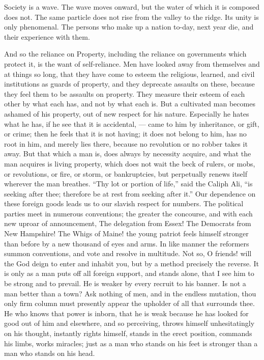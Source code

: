 \documentclass{article}
\begin{document}
Society is a wave. The wave moves onward, but the water of which it is
composed does not. The same particle does not rise from the valley to the
ridge. Its unity is only phenomenal. The persons who make up a nation
to-day, next year die, and their experience with them.

And so the reliance on Property, including the reliance on governments which
protect it, is the want of self-reliance. Men have looked away from
themselves and at things so long, that they have come to esteem the
religious, learned, and civil institutions as guards of property, and they
deprecate assaults on these, because they feel them to be assaults on
property. They measure their esteem of each other by what each has, and not
by what each is. But a cultivated man becomes ashamed of his property, out
of new respect for his nature. Especially he hates what he has, if he see
that it is accidental, --- came to him by inheritance, or gift, or crime;
then he feels that it is not having; it does not belong to him, has no root
in him, and merely lies there, because no revolution or no robber takes it
away. But that which a man is, does always by necessity acquire, and what the
man acquires is living property, which does not wait the beck of rulers, or
mobs, or revolutions, or fire, or storm, or bankruptcies, but perpetually
renews itself wherever the man breathes. ``Thy lot or portion of life,'' said
the Caliph Ali, ``is seeking after thee; therefore be at rest from seeking
after it.'' Our dependence on these foreign goods leads us to our slavish
respect for numbers. The political parties meet in numerous conventions; the
greater the concourse, and with each new uproar of announcement, The
delegation from Essex! The Democrats from New Hampshire! The Whigs of Maine!
the young patriot feels himself stronger than before by a new thousand of
eyes and arms. In like manner the reformers summon conventions, and vote and
resolve in multitude. Not so, O friends! will the God deign to enter and
inhabit you, but by a method precisely the reverse. It is only as a man puts
off all foreign support, and stands alone, that I see him to be strong and
to prevail. He is weaker by every recruit to his banner. Is not a man better
than a town? Ask nothing of men, and in the endless mutation, thou only firm
column must presently appear the upholder of all that surrounds thee. He who
knows that power is inborn, that he is weak because he has looked for good
out of him and elsewhere, and so perceiving, throws himself unhesitatingly
on his thought, instantly rights himself, stands in the erect position,
commands his limbs, works miracles; just as a man who stands on his feet is
stronger than a man who stands on his head.
\end{document}
